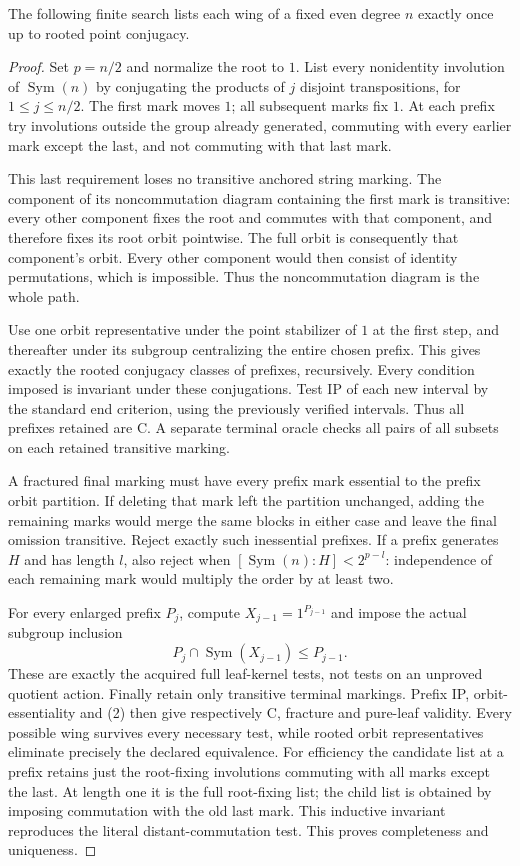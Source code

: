 \documentclass[11pt,a4paper]{article}
\newcommand{\Sym}{\operatorname{Sym}}\newcommand{\gen}[1]{\langle#1\rangle}
\begin{document}
\begin{lemma}\label{search}
The following finite search lists each wing of a fixed even degree $n$
exactly once up to rooted point conjugacy.
\end{lemma}
\begin{proof}
Set $p=n/2$ and normalize the root to $1$. List every nonidentity
involution of $\Sym(n)$ by conjugating the products of $j$ disjoint
transpositions, for $1\le j\le n/2$. The first mark moves $1$;
all subsequent marks fix $1$. At each prefix try involutions outside
the group already generated, commuting with every earlier mark except
the last, and not commuting with that last mark.

This last requirement loses no transitive anchored string marking.
The component of its noncommutation diagram containing the first mark
is transitive: every other component fixes the root and commutes with
that component, and therefore fixes its root orbit pointwise. The full
orbit is consequently that component's orbit. Every other component
would then consist of identity permutations, which is impossible.
Thus the noncommutation diagram is the whole path.

Use one orbit representative under the point stabilizer of $1$ at the
first step, and thereafter under its subgroup centralizing the entire
chosen prefix. This gives exactly the rooted conjugacy classes of
prefixes, recursively. Every condition imposed is invariant under
these conjugations. Test IP of each new interval by the standard end
criterion, using the previously verified intervals. Thus all prefixes
retained are C. A separate terminal oracle checks all pairs of all
subsets on each retained transitive marking.

A fractured final marking must have every prefix mark essential to
the prefix orbit partition. If deleting that mark left the partition
unchanged, adding the remaining marks would merge the same blocks
in either case and leave the final omission transitive. Reject exactly
such inessential prefixes. If a prefix generates $H$ and has length
$l$, also reject when $[\Sym(n):H]<2^{p-l}$: independence of each
remaining mark would multiply the order by at least two.

For every enlarged prefix $P_j$, compute $X_{j-1}=1^{P_{j-1}}$
and impose the actual subgroup inclusion
\[
                 P_j\cap\Sym(X_{j-1})\le P_{j-1}.       \tag{2}
\]
These are exactly the acquired full leaf-kernel tests, not tests on
an unproved quotient action. Finally retain only transitive terminal
markings. Prefix IP, orbit-essentiality and (2) then give respectively
C, fracture and pure-leaf validity. Every possible wing survives every
necessary test, while rooted orbit representatives eliminate precisely
the declared equivalence. For efficiency the candidate list at a prefix retains just the
root-fixing involutions commuting with all marks except the last.
At length one it is the full root-fixing list; the child list is
obtained by imposing commutation with the old last mark. This
inductive invariant reproduces the literal distant-commutation test.
This proves completeness and uniqueness.
\end{proof}
\end{document}
